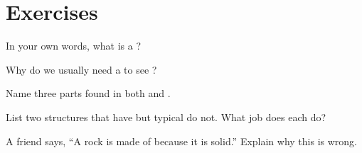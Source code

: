 \section{Exercises}

\begin{exercise}[$\star$]\label{exo:g4:cells:1}
In your own words, what is a ?
\end{exercise}

\begin{exercise}[$\star$]\label{exo:g4:cells:2}
Why do we usually need a  to see ?
\end{exercise}

\begin{exercise}[$\star$]\label{exo:g4:cells:3}
Name three parts found in both   and  .
\end{exercise}

\begin{exercise}[$\star$]\label{exo:g4:cells:4}
List two structures that   have but typical   do
not. What job does each do?
\end{exercise}

\begin{exercise}[$\star\star$]\label{exo:g4:cells:5}
A friend says, ``A rock is made of  because it is solid.'' Explain
why this is wrong.
\end{exercise}

